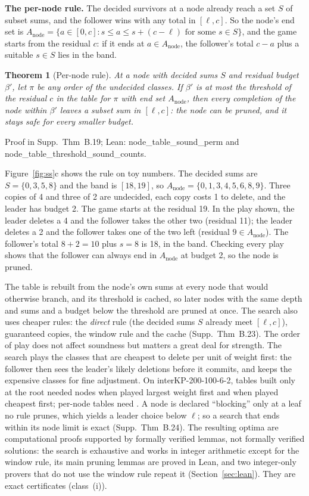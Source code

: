 \documentclass[]{spie}  %
\theoremstyle{plain}
\newtheorem{thm}{Theorem}
\newcommand{\lean}[1]{\mbox{\ttfamily #1}}   %
\newcommand{\inst}[1]{\mbox{#1}}             %
\newcommand{\cls}[1]{class~(#1)}             %
\begin{document}
\textbf{The per-node rule.} The decided survivors at a node already reach a set $S$ of subset sums,
and the follower wins with any total in $[\ell,c]$. So the node's end set is
$A_{\mathrm{node}}=\{a\in[0,c]: s\le a\le s+(c-\ell)\text{ for some }s\in S\}$, and the game starts
from the residual $c$: if it ends at $a\in A_{\mathrm{node}}$, the follower's total $c-a$ plus a
suitable $s\in S$ lies in the band.

\begin{thm}[Per-node rule]\label{thm:node}
At a node with decided sums $S$ and residual budget $\beta'$, let $\pi$ be any order of the
undecided classes. If $\beta'$ is at most the threshold of the residual $c$ in the table for
$\pi$ with end set $A_{\mathrm{node}}$, then every completion of the node within $\beta'$ leaves
a subset sum in $[\ell,c]$: the node can be pruned, and it stays safe for every smaller budget.
\end{thm}
\noindent Proof in Supp.\ Thm~B.19; Lean: \lean{node\_table\_sound\_perm} and
\lean{node\_table\_threshold\_sound\_counts}.

Figure~\ref{fig:ss}c shows the rule on toy numbers. The decided sums are $S=\{0,3,5,8\}$ and the
band is $[18,19]$, so $A_{\mathrm{node}}=\{0,1,3,4,5,6,8,9\}$. Three copies of 4 and three of 2
are undecided, each copy costs 1 to delete, and the leader has budget 2. The game starts at the
residual 19. In the play shown, the leader deletes a 4 and the follower takes the other two
(residual 11); the leader deletes a 2 and the follower takes one of the two left (residual
$9\in A_{\mathrm{node}}$). The follower's total $8+2=10$ plus $s=8$ is 18, in the band. Checking
every play shows that the follower can always end in $A_{\mathrm{node}}$ at budget 2, so the node
is pruned.

The table is rebuilt from the node's own sums at every node that would otherwise branch, and
its threshold is cached, so later nodes with the same depth and sums and a budget below the
threshold are pruned at once. The search also uses cheaper rules: the \emph{direct} rule (the
decided sums $S$ already meet $[\ell,c]$), guaranteed copies, the window rule and the cache (Supp.\
Thm~B.23). The order of play does not affect soundness but matters a great deal for strength. The
search plays the classes that are cheapest to delete per unit of weight first: the follower then
sees the leader's likely deletions before it commits, and keeps the expensive classes for fine
adjustment. On \inst{interKP-200-100-6-2}, tables built only at the root needed
\KipAblationLargestFirst{} nodes when played largest weight first and \KipAblationCheapestFirst{}
when played cheapest first; per-node tables need \KipAfterNodesTwoSixTwo{}. A node is declared
``blocking'' only at a leaf no rule prunes, which yields a leader choice below $\ell$; so a search
that ends within its node limit is exact (Supp.\ Thm~B.24). The resulting optima are
computational proofs supported by formally verified lemmas, not formally verified solutions: the
search is exhaustive and works in integer arithmetic except for the window rule, its main pruning
lemmas are proved in Lean, and two integer-only provers that do not use the window rule repeat it
(Section~\ref{sec:lean}). They are exact certificates (\cls{i}).
\end{document}
